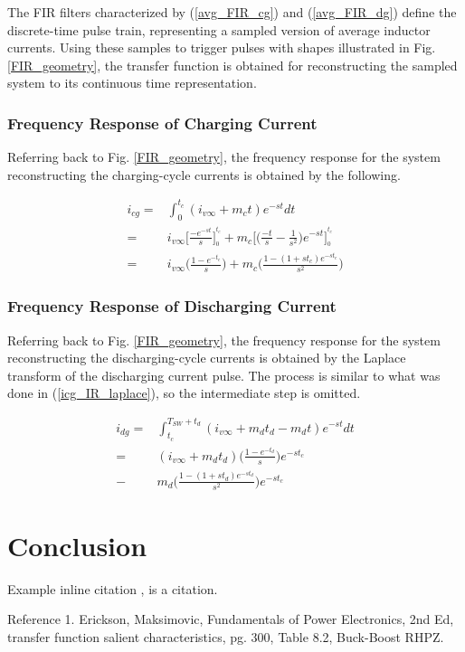 \documentclass[conference]{IEEEtran}
\begin{document}
The FIR filters characterized by (\ref{avg_FIR_cg}) and (\ref{avg_FIR_dg}) define the discrete-time pulse train, representing a sampled version of average inductor currents.  Using these samples to trigger pulses with shapes illustrated in Fig. \ref{FIR_geometry}, the transfer function is obtained for reconstructing the sampled system to its continuous time representation. 

\subsubsection{Frequency Response of Charging Current}
Referring back to Fig. \ref{FIR_geometry}, the frequency response for the system reconstructing the charging-cycle currents is obtained by the following.

\begin{align}
i_{cg} =& \int_0^{t_c}(i_{v\infty} + m_c t)e^{-st}dt \nonumber \\
	   =& i_{v\infty}\bigg[ \frac{-e^{-st}}{s} \bigg]^{\stackrel{t_c}{}} _{\stackrel{0}{}}
	   + m_c\bigg[ \bigg( \frac{-t}{s} - \frac{1}{s^2} \bigg) e^{-st} \bigg]^{\stackrel{t_c}{}} _{\stackrel{0}{}} \nonumber \\
	   =&  i_{v\infty} \bigg( \frac{1 - e^{-t_c}}{s} \bigg)
	   + m_c\bigg( \frac{1 - (1 + st_c)e^{-st_c}}{s^2} \bigg)
	   \label{icg_IR_laplace}
\end{align}

\subsubsection{Frequency Response of Discharging Current}
Referring back to Fig. \ref{FIR_geometry}, the frequency response for the system reconstructing the discharging-cycle currents is obtained by the Laplace transform of the discharging current pulse.  The process is similar to what was done in (\ref{icg_IR_laplace}), so the intermediate step is omitted.

\begin{align}
i_{dg} =& \int_{t_c}^{T_{SW}+t_d}(i_{v\infty} 
+ m_d t_d - m_d t) e^{-st}dt \nonumber \\
 = & (i_{v\infty} +m_d t_d) \bigg( \frac{1 - e^{-t_d}}{s} \bigg)  e^{-st_c} \nonumber \\
- & m_d \bigg( \frac{1 - (1 + st_d)e^{-st_d}}{s^2} \bigg)  e^{-st_c}
\label{idg_IR_laplace}
\end{align}


\section{Conclusion}

Example inline citation
\cite{b1}, is a citation.


\begin{thebibliography}{00}
 Reference 1.
 Erickson, Maksimovic, Fundamentals of Power Electronics, 2nd Ed, transfer function salient characteristics, pg. 300, Table 8.2, Buck-Boost RHPZ.
\end{thebibliography}
\end{document}
